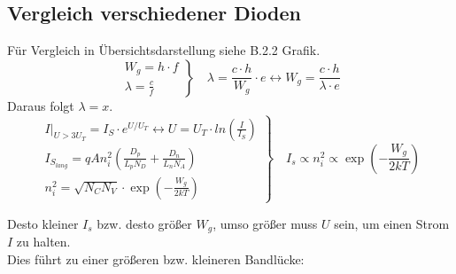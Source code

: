 \documentclass[
	a4paper, %
	12pt, %
]{CSUniSchoolLabReport}
\begin{document}
\vspace{1em} 

\subsection{Vergleich verschiedener Dioden}
Für Vergleich in Übersichtsdarstellung siehe B.2.2 Grafik.
\[
\left.
\begin{array}{l}
W_g = h \cdot f \\
\lambda = \frac{c}{f}
\end{array}
\right\}
\quad \lambda = \frac{c\cdot h}{W_g} \cdot e \leftrightarrow W_g = \frac{c \cdot h}{\lambda \cdot e}
\]
Daraus folgt $\lambda = x$. \\

\[
\left.
\begin{array}{l}
I|_{U>3U_T} = I_S\cdot e^{U/U_T} \leftrightarrow U = U_T\cdot ln(\frac{I}{I_S}) \\
I_{S_{lang}} = q A n_i^2 \left( \frac{D_p}{L_p N_D} + \frac{D_n}{L_n N_A} \right) \\
n_i^2 = \sqrt{N_C N_V} \cdot \exp\left(-\frac{W_g}{2kT}\right)
\end{array}
\right\}
\quad I_s \varpropto n_i^2 \varpropto \exp\left(-\frac{W_g}{2kT}\right)
\]

\vspace{1em} 

Desto kleiner $I_s$ bzw. desto größer $W_g$, umso größer muss $U$ sein, um einen Strom $I$ zu halten.\\  
Dies führt zu einer größeren bzw. kleineren Bandlücke:\\

\end{document}

